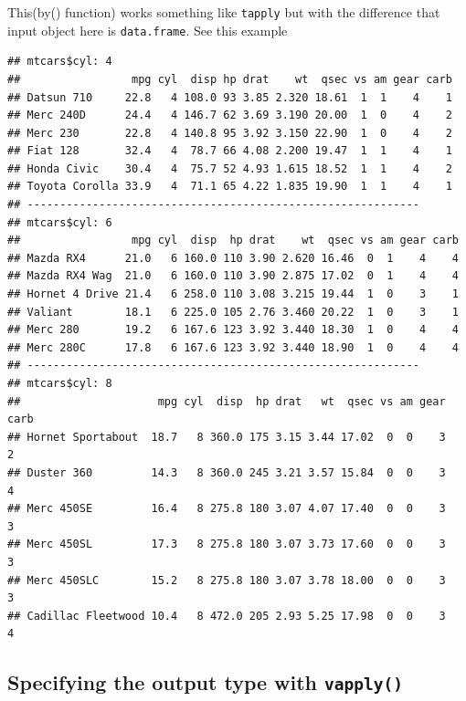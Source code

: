 \documentclass[
]{book}
\newenvironment{Shaded}{\begin{snugshade}}{\end{snugshade}}
\newcommand{\CommentTok}[1]{\textcolor[rgb]{0.56,0.35,0.01}{\textit{#1}}}
\newcommand{\FunctionTok}[1]{\textcolor[rgb]{0.13,0.29,0.53}{\textbf{#1}}}
\newcommand{\NormalTok}[1]{#1}
\newcommand{\SpecialCharTok}[1]{\textcolor[rgb]{0.81,0.36,0.00}{\textbf{#1}}}
\begin{document}
This\index(by() function) works something like \texttt{tapply} but with the difference that input object here is \texttt{data.frame}. See this example

\begin{Shaded}
\end{Shaded}

\begin{verbatim}
## mtcars$cyl: 4
##                 mpg cyl  disp hp drat    wt  qsec vs am gear carb
## Datsun 710     22.8   4 108.0 93 3.85 2.320 18.61  1  1    4    1
## Merc 240D      24.4   4 146.7 62 3.69 3.190 20.00  1  0    4    2
## Merc 230       22.8   4 140.8 95 3.92 3.150 22.90  1  0    4    2
## Fiat 128       32.4   4  78.7 66 4.08 2.200 19.47  1  1    4    1
## Honda Civic    30.4   4  75.7 52 4.93 1.615 18.52  1  1    4    2
## Toyota Corolla 33.9   4  71.1 65 4.22 1.835 19.90  1  1    4    1
## ------------------------------------------------------------ 
## mtcars$cyl: 6
##                 mpg cyl  disp  hp drat    wt  qsec vs am gear carb
## Mazda RX4      21.0   6 160.0 110 3.90 2.620 16.46  0  1    4    4
## Mazda RX4 Wag  21.0   6 160.0 110 3.90 2.875 17.02  0  1    4    4
## Hornet 4 Drive 21.4   6 258.0 110 3.08 3.215 19.44  1  0    3    1
## Valiant        18.1   6 225.0 105 2.76 3.460 20.22  1  0    3    1
## Merc 280       19.2   6 167.6 123 3.92 3.440 18.30  1  0    4    4
## Merc 280C      17.8   6 167.6 123 3.92 3.440 18.90  1  0    4    4
## ------------------------------------------------------------ 
## mtcars$cyl: 8
##                     mpg cyl  disp  hp drat   wt  qsec vs am gear carb
## Hornet Sportabout  18.7   8 360.0 175 3.15 3.44 17.02  0  0    3    2
## Duster 360         14.3   8 360.0 245 3.21 3.57 15.84  0  0    3    4
## Merc 450SE         16.4   8 275.8 180 3.07 4.07 17.40  0  0    3    3
## Merc 450SL         17.3   8 275.8 180 3.07 3.73 17.60  0  0    3    3
## Merc 450SLC        15.2   8 275.8 180 3.07 3.78 18.00  0  0    3    3
## Cadillac Fleetwood 10.4   8 472.0 205 2.93 5.25 17.98  0  0    3    4
\end{verbatim}

\hypertarget{specifying-the-output-type-with-vapply}{%
\subsection{\texorpdfstring{Specifying the output type with \texttt{vapply()}}{Specifying the output type with vapply()}}\label{specifying-the-output-type-with-vapply}}
\end{document}
